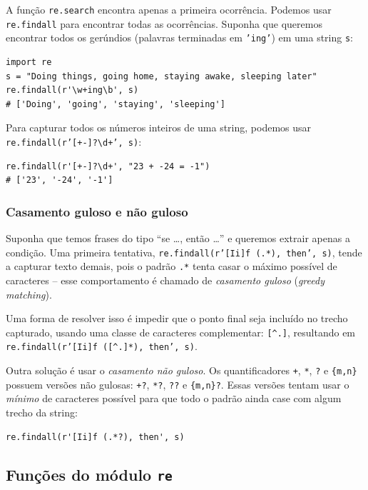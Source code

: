 \documentclass[11pt,a4paper]{article}
\begin{document}
A função \texttt{re.search} encontra apenas a primeira ocorrência.
Podemos usar \texttt{re.findall} para encontrar todas as ocorrências.
Suponha que queremos encontrar todos os gerúndios (palavras terminadas em
\texttt{'ing'}) em uma string \texttt{s}:

\begin{lstlisting}
import re
s = "Doing things, going home, staying awake, sleeping later"
re.findall(r'\w+ing\b', s)
# ['Doing', 'going', 'staying', 'sleeping']
\end{lstlisting}

Para capturar todos os números inteiros de uma string, podemos usar
\texttt{re.findall(r'[+-]?\textbackslash d+', s)}:

\begin{lstlisting}
re.findall(r'[+-]?\d+', "23 + -24 = -1")
# ['23', '-24', '-1']
\end{lstlisting}

\subsubsection{Casamento guloso e não guloso}

Suponha que temos frases do tipo ``se \dots, então \dots'' e queremos
extrair apenas a condição. Uma primeira tentativa,
\texttt{re.findall(r'[Ii]f (.*), then', s)}, tende a capturar texto
demais, pois o padrão \texttt{.*} tenta casar o máximo possível de
caracteres -- esse comportamento é chamado de \emph{casamento guloso}
(\emph{greedy matching}).

Uma forma de resolver isso é impedir que o ponto final seja incluído no
trecho capturado, usando uma classe de caracteres complementar:
\texttt{[\^{}.]}, resultando em
\texttt{re.findall(r'[Ii]f ([\^{}.]*), then', s)}.

Outra solução é usar o \emph{casamento não guloso}. Os quantificadores
\texttt{+}, \texttt{*}, \texttt{?} e \texttt{\{m,n\}} possuem versões não
gulosas: \texttt{+?}, \texttt{*?}, \texttt{??} e \texttt{\{m,n\}?}. Essas
versões tentam usar o \emph{mínimo} de caracteres possível para que todo
o padrão ainda case com algum trecho da string:

\begin{lstlisting}
re.findall(r'[Ii]f (.*?), then', s)
\end{lstlisting}

\subsection{Funções do módulo \texttt{re}}
\end{document}
